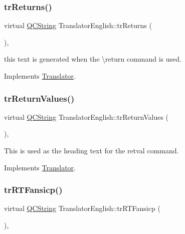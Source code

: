 \subsubsection{\texorpdfstring{trReturns()}{trReturns()}}
{\footnotesize\ttfamily virtual \mbox{\hyperlink{class_q_c_string}{Q\+C\+String}} Translator\+English\+::tr\+Returns (\begin{DoxyParamCaption}{ }\end{DoxyParamCaption})\hspace{0.3cm}{\ttfamily [inline]}, {\ttfamily [virtual]}}

this text is generated when the \textbackslash{}return command is used. 

Implements \mbox{\hyperlink{class_translator}{Translator}}.

\mbox{\label{class_translator_english_a9bb765311ef602e4365050b1b81637cb}} 
\subsubsection{\texorpdfstring{trReturnValues()}{trReturnValues()}}
{\footnotesize\ttfamily virtual \mbox{\hyperlink{class_q_c_string}{Q\+C\+String}} Translator\+English\+::tr\+Return\+Values (\begin{DoxyParamCaption}{ }\end{DoxyParamCaption})\hspace{0.3cm}{\ttfamily [inline]}, {\ttfamily [virtual]}}

This is used as the heading text for the retval command. 

Implements \mbox{\hyperlink{class_translator}{Translator}}.

\mbox{\label{class_translator_english_a58d43df9c7e82cf874f2d0ac64547a3a}} 
\subsubsection{\texorpdfstring{trRTFansicp()}{trRTFansicp()}}
{\footnotesize\ttfamily virtual \mbox{\hyperlink{class_q_c_string}{Q\+C\+String}} Translator\+English\+::tr\+R\+T\+Fansicp (\begin{DoxyParamCaption}{ }\end{DoxyParamCaption})\hspace{0.3cm}{\ttfamily [inline]}, {\ttfamily [virtual]}}

